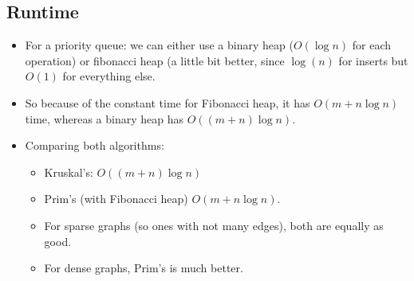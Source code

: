 \documentclass[10pt]{article}
\begin{document}
	\subsection{Runtime}
	\begin{itemize}
		\item For a priority queue: we can either use a binary heap ($O(\log n)$ for each operation) or 
			fibonacci heap (a little bit better, since $\log(n)$ for inserts but $O(1)$ for everything else. 
		\item So because of the constant time for Fibonacci heap, it has $O(m + n \log n)$ time, whereas
			a binary heap has $O((m + n) \log n)$.
		\item Comparing both algorithms:
			\begin{itemize}
				\item Kruskal's: $O((m + n) \log n)$
				\item Prim's (with Fibonacci heap) $O(m + n \log n)$.
				\item For sparse graphs (so ones with not many edges), both are equally as good.
				\item For dense graphs, Prim's is much better. 
			\end{itemize}
	\end{itemize}
\end{document}
